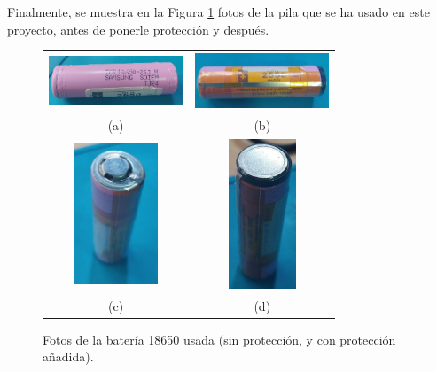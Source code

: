\documentclass[12pt]{article}
\begin{document}
	\noindent Finalmente, se muestra en la Figura \ref{18650 con y sin proteccion} fotos de la pila que se ha usado en este proyecto, antes de ponerle protección y después.
	
	\begin{figure}[h!]
		\begin{center}
			\begin{tabular}{cc}
				\includegraphics[width=40mm]{img/18650_sinProteccion.jpg} &   \includegraphics[width=40mm]{img/18650_conProteccion_1.jpg} \\
				(a) & (b) \\[6pt]
				\includegraphics[width=25mm]{img/18650_conProteccion_2.jpg} &   \includegraphics[width=20mm]{img/18650_conProteccion_3.jpg} \\
				(c)  & (d)  \\[6pt]
			\end{tabular}
			\caption{Fotos de la batería 18650 usada (sin protección, y con protección añadida).}
			\label{18650 con y sin proteccion}
		\end{center}
	\end{figure}
	
\end{document}
